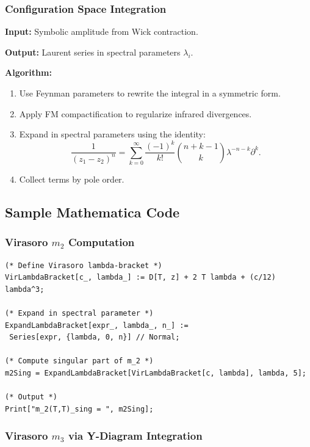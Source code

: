 \subsubsection{Configuration Space Integration}

\textbf{Input:} Symbolic amplitude from Wick contraction.

\textbf{Output:} Laurent series in spectral parameters $\lambda_i$.

\textbf{Algorithm:}
\begin{enumerate}
\item Use Feynman parameters to rewrite the integral in a symmetric form.
\item Apply FM compactification to regularize infrared divergences.
\item Expand in spectral parameters using the identity:
\[
\frac{1}{(z_1-z_2)^n} = \sum_{k=0}^\infty \frac{(-1)^k}{k!} \binom{n+k-1}{k} \lambda^{-n-k} \partial^k.
\]
\item Collect terms by pole order.
\end{enumerate}

\subsection{Sample Mathematica Code}

\subsubsection{Virasoro $m_2$ Computation}

\begin{verbatim}
(* Define Virasoro lambda-bracket *)
VirLambdaBracket[c_, lambda_] := D[T, z] + 2 T lambda + (c/12) lambda^3;

(* Expand in spectral parameter *)
ExpandLambdaBracket[expr_, lambda_, n_] :=
 Series[expr, {lambda, 0, n}] // Normal;

(* Compute singular part of m_2 *)
m2Sing = ExpandLambdaBracket[VirLambdaBracket[c, lambda], lambda, 5];

(* Output *)
Print["m_2(T,T)_sing = ", m2Sing];
\end{verbatim}

\subsubsection{Virasoro $m_3$ via Y-Diagram Integration}

